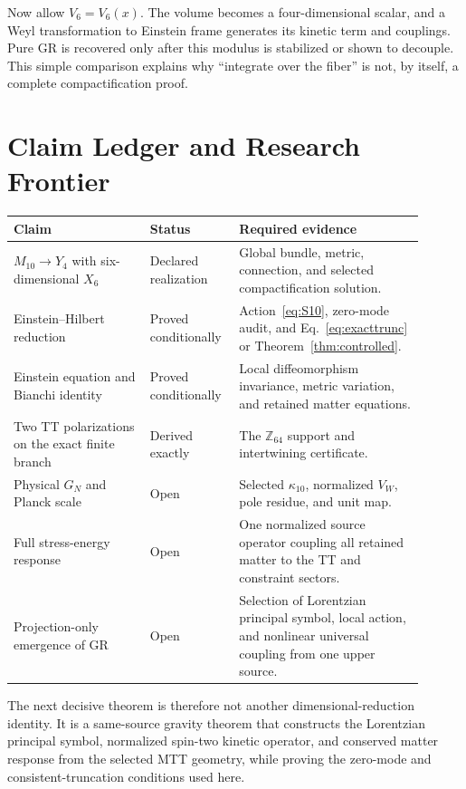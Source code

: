 \documentclass[11pt,a4paper]{article}
\theoremstyle{definition}
\theoremstyle{remark}
\begin{document}
Now allow \(V_6=V_6(x)\).  The volume becomes a four-dimensional scalar, and a
Weyl transformation to Einstein frame generates its kinetic term and
couplings.  Pure GR is recovered only after this modulus is stabilized or
shown to decouple.  This simple comparison explains why ``integrate over the
fiber'' is not, by itself, a complete compactification proof.

\section{Claim Ledger and Research Frontier}

\begin{center}
\begin{tabular}{p{0.31\linewidth}p{0.17\linewidth}p{0.42\linewidth}}
\toprule
Claim & Status & Required evidence \\
\midrule
\(M_{10}\to Y_4\) with six-dimensional \(X_6\) &
Declared realization &
Global bundle, metric, connection, and selected compactification solution. \\
Einstein--Hilbert reduction &
Proved conditionally &
Action~\eqref{eq:S10}, zero-mode audit, and
Eq.~\eqref{eq:exacttrunc} or Theorem~\ref{thm:controlled}. \\
Einstein equation and Bianchi identity &
Proved conditionally &
Local diffeomorphism invariance, metric variation, and retained matter
equations. \\
Two TT polarizations on the exact finite branch &
Derived exactly &
The \(\mathbb Z_{64}\) support and intertwining certificate. \\
Physical \(G_N\) and Planck scale &
Open &
Selected \(\kappa_{10}\), normalized \(V_W\), pole residue, and unit map. \\
Full stress-energy response &
Open &
One normalized source operator coupling all retained matter to the TT and
constraint sectors. \\
Projection-only emergence of GR &
Open &
Selection of Lorentzian principal symbol, local action, and nonlinear
universal coupling from one upper source. \\
\bottomrule
\end{tabular}
\end{center}

The next decisive theorem is therefore not another dimensional-reduction
identity.  It is a same-source gravity theorem that constructs the Lorentzian
principal symbol, normalized spin-two kinetic operator, and conserved matter
response from the selected MTT geometry, while proving the zero-mode and
consistent-truncation conditions used here.
\end{document}
